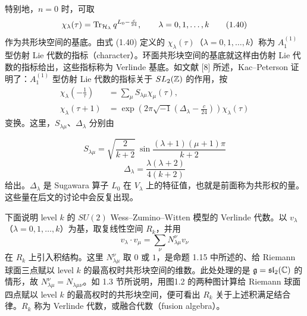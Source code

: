 特别地，$n=0$ 时，可取
\begin{equation}
  \chi_\lambda(\tau)=\operatorname{Tr}_{\mathcal{H}_\lambda}q^{L_0-\frac{c}{24}},\qquad
  \lambda=0,1,\dots,k \tag{1.40}
\end{equation}
作为共形块空间的基底。由式 (1.40) 定义的 $\chi_\lambda(\tau)$（$\lambda=0,1,\dots,k$）称为 $A_1^{(1)}$ 型仿射 Lie 代数的指标（character）。环面共形块空间的基底就这样由仿射 Lie 代数的指标给出，这些指标称为 Verlinde 基底。如文献 [8] 所述，Kac--Peterson 证明了：$A_1^{(1)}$ 型仿射 Lie 代数的指标关于 $SL_2(\mathbb{Z})$ 的作用，按
\begin{equation}
\begin{aligned}
\chi_\lambda\left(-\frac{1}{\tau}\right)&=\sum_{\mu}S_{\lambda\mu}\chi_\mu(\tau),\\
\chi_\lambda(\tau+1)&=\exp\left(2\pi\sqrt{-1}\left(\Delta_\lambda-\frac{c}{24}\right)\right)\chi_\lambda(\tau)
\end{aligned}
\tag{1.41}
\end{equation}
变换。这里，$S_{\lambda\mu}$、$\Delta_\lambda$ 分别由


\begin{equation}
  S_{\lambda\mu}=\sqrt{\frac{2}{k+2}}\ \sin\frac{(\lambda+1)(\mu+1)\pi}{k+2} \tag{1.42}
\end{equation}
\begin{equation}
  \Delta_\lambda=\frac{\lambda(\lambda+2)}{4(k+2)} \tag{1.43}
\end{equation}
给出。$\Delta_\lambda$ 是 Sugawara 算子 $L_0$ 在 $V_\lambda$ 上的特征值，也就是前面称为共形权的量。这些量在后文的讨论中会反复出现。


下面说明 level $k$ 的 $SU(2)$ Wess--Zumino--Witten 模型的 Verlinde 代数。以 $v_\lambda$（$\lambda=0,1,\dots,k$）为基，取复线性空间 $R_k$，并用
\[
v_\lambda\cdot v_\mu=\sum_{\nu}N_{\lambda\mu}^{\nu}v_\nu
\]
在 $R_k$ 上引入积结构。这里 $N_{\lambda\mu}^{\nu}$ 取 $0$ 或 $1$，是命题 1.15 中所述的、给 Riemann 球面三点赋以 level $k$ 的最高权时共形块空间的维数。此处处理的是 $\mathfrak{g}=\mathfrak{sl}_2(\mathbb{C})$ 的情形，故 $N_{\lambda\mu}^{\nu}=N_{\lambda\mu\nu}$。如 1.3 节所说明，用图1.2 的两种图计算给 Riemann 球面四点赋以 level $k$ 的最高权时的共形块空间，便可看出 $R_k$ 关于上述积满足结合律。$R_k$ 称为 Verlinde 代数，或融合代数（fusion algebra）。

